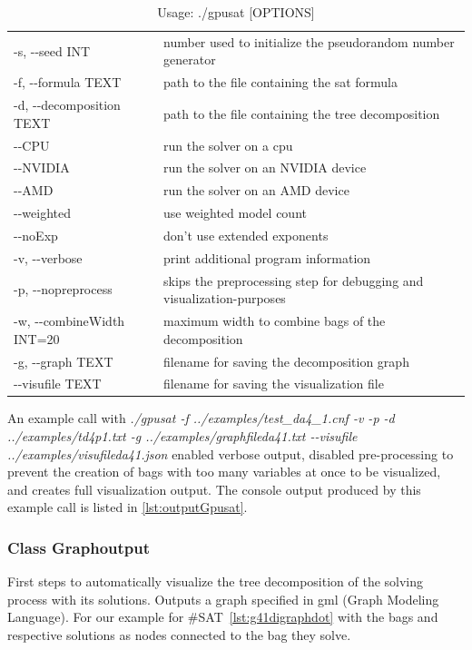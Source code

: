 \documentclass[a4paper, 12pt]{scrartcl}
\begin{document}
\begin{longtable}{ll}
	\caption{Usage: ./gpusat [OPTIONS]
		\label{tab:optionsgpusat}}\\
	\hline
	\vspace{0.5ex}
	\endfirsthead
-s, -{}-seed INT&  number used to initialize the pseudorandom number generator\\
	-f, -{}-formula TEXT &  path to the file containing the sat formula\\
	-d, -{}-decomposition TEXT  &   path to the file containing the tree decomposition\\
	-{}-CPU                   &    run the solver on a cpu\\
	-{}-NVIDIA                &    run the solver on an NVIDIA device\\
	-{}-AMD                   &    run the solver on an AMD device\\
	-{}-weighted              &   use weighted model count\\
	-{}-noExp                 &    don't use extended exponents\\
	-v, -{}-verbose            &    print additional program information\\
	-p, -{}-nopreprocess       &    skips the preprocessing step for debugging and visualization-purposes\\
	-w, -{}-combineWidth INT=20&    maximum width to combine bags of the decomposition\\
	-g, -{}-graph TEXT         &    filename for saving the decomposition graph\\
	-{}-visufile TEXT         &    filename for saving the visualization file\\

\end{longtable}      
        
An example call with \textit{./gpusat -f ../examples/test\_da4\_1.cnf -v -p -d ../examples/td4p1.txt  -g ../examples/graphfileda41.txt -{}-visufile ../examples/visufileda41.json} enabled verbose output, disabled pre-processing to prevent the creation of bags with too many variables at once to be visualized, and creates full visualization output. 
The console output produced by this example call is listed in \ref{lst:outputGpusat}.

\subsubsection{Class Graphoutput}\label{chagraphoutput}
First steps to automatically visualize the tree decomposition of the solving process with its solutions.
Outputs a graph specified in gml\cite{Himsolt2010GMLAP} (Graph Modeling Language).
For our example for \#SAT~\ref{lst:g41digraphdot} with the bags and respective solutions as nodes connected to the bag they solve.
\end{document}
